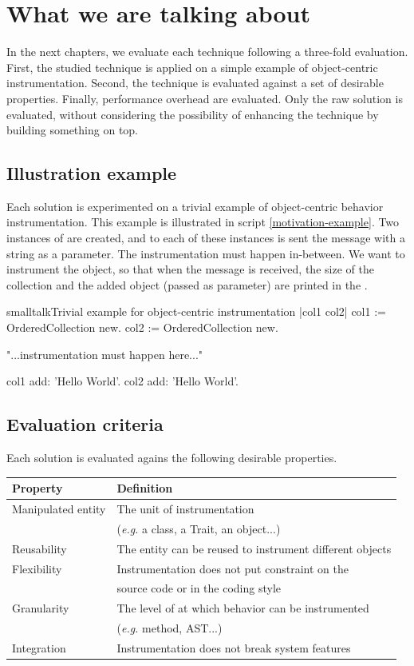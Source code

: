 \documentclass[10pt,twoside,english]{_support/latex/sbabook/sbabook}
\begin{document}
\frontmatter
\pagestyle{plain}

\tableofcontents*
\clearpage\listoffigures

\mainmatter

\chapter{What we are talking about}
In the next chapters, we evaluate each technique following a three-fold evaluation. First, the studied technique is applied on a simple example of object-centric instrumentation. Second, the technique is evaluated against a set of desirable properties. Finally, performance overhead are evaluated. Only the raw solution is evaluated, without considering the possibility of enhancing the technique by building something on top.
\section{Illustration example}
Each solution is experimented on a trivial example of object-centric behavior instrumentation. This example is illustrated in script \ref{motivation-example}. Two instances of  are created, and to each of these instances is sent the  message with a string as a parameter. The instrumentation must happen in-between. We want to instrument the  object, so that when the  message is received, the size of the collection and the added object (passed as parameter) are printed in the .

\begin{listing}[float, label=motivation-example]{smalltalk}{Trivial example for object-centric instrumentation}
|col1 col2|
col1 := OrderedCollection new.
col2 := OrderedCollection new.

"...instrumentation must happen here..."

col1 add: 'Hello World'.
col2 add: 'Hello World'.
\end{listing}
\section{Evaluation criteria}
Each solution is evaluated agains the following desirable properties.

\begin{tabular}{ll}
\toprule
\textbf{Property} & \textbf{Definition} \\
\midrule
Manipulated entity & The unit of instrumentation \\
 & (\textit{e.g.} a class, a Trait, an object...) \\
Reusability & The entity can be reused to instrument different objects \\
Flexibility & Instrumentation does not put constraint on the \\
 & source code or in the coding style \\
Granularity & The level of at which behavior can be instrumented \\
 & (\textit{e.g.} method, AST...) \\
Integration & Instrumentation does not break system features \\
\bottomrule
\end{tabular}
\end{document}

